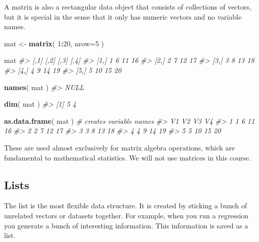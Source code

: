 \documentclass[]{book}
\newenvironment{Shaded}{\begin{snugshade}}{\end{snugshade}}
\newcommand{\CommentTok}[1]{\textcolor[rgb]{0.56,0.35,0.01}{\textit{#1}}}
\newcommand{\DataTypeTok}[1]{\textcolor[rgb]{0.13,0.29,0.53}{#1}}
\newcommand{\DecValTok}[1]{\textcolor[rgb]{0.00,0.00,0.81}{#1}}
\newcommand{\KeywordTok}[1]{\textcolor[rgb]{0.13,0.29,0.53}{\textbf{#1}}}
\newcommand{\NormalTok}[1]{#1}
\newcommand{\OperatorTok}[1]{\textcolor[rgb]{0.81,0.36,0.00}{\textbf{#1}}}
\newcommand{\StringTok}[1]{\textcolor[rgb]{0.31,0.60,0.02}{#1}}
\theoremstyle{definition}
\theoremstyle{definition}
\theoremstyle{definition}
\theoremstyle{remark}
\begin{document}
A matrix is also a rectangular data object that consists of collections
of vectors, but it is special in the sense that it only has numeric
vectors and no variable names.

\begin{Shaded}
\begin{Highlighting}[]

\NormalTok{mat <-}\StringTok{ }\KeywordTok{matrix}\NormalTok{( }\DecValTok{1}\OperatorTok{:}\DecValTok{20}\NormalTok{, }\DataTypeTok{nrow=}\DecValTok{5}\NormalTok{ )}

\NormalTok{mat}
\CommentTok{#>      [,1] [,2] [,3] [,4]}
\CommentTok{#> [1,]    1    6   11   16}
\CommentTok{#> [2,]    2    7   12   17}
\CommentTok{#> [3,]    3    8   13   18}
\CommentTok{#> [4,]    4    9   14   19}
\CommentTok{#> [5,]    5   10   15   20}

\KeywordTok{names}\NormalTok{( mat )}
\CommentTok{#> NULL}

\KeywordTok{dim}\NormalTok{( mat )}
\CommentTok{#> [1] 5 4}

\KeywordTok{as.data.frame}\NormalTok{( mat )  }\CommentTok{# creates variable names}
\CommentTok{#>   V1 V2 V3 V4}
\CommentTok{#> 1  1  6 11 16}
\CommentTok{#> 2  2  7 12 17}
\CommentTok{#> 3  3  8 13 18}
\CommentTok{#> 4  4  9 14 19}
\CommentTok{#> 5  5 10 15 20}
\end{Highlighting}
\end{Shaded}

These are used almost exclusively for matrix algebra operations, which
are fundamental to mathematical statistics. We will not use matrices in
this course.

\hypertarget{lists}{%
\subsection{Lists}\label{lists}}

The list is the most flexible data structure. It is created by sticking
a bunch of unrelated vectors or datasets together. For example, when you
run a regression you generate a bunch of interesting information. This
information is saved as a list.
\end{document}
